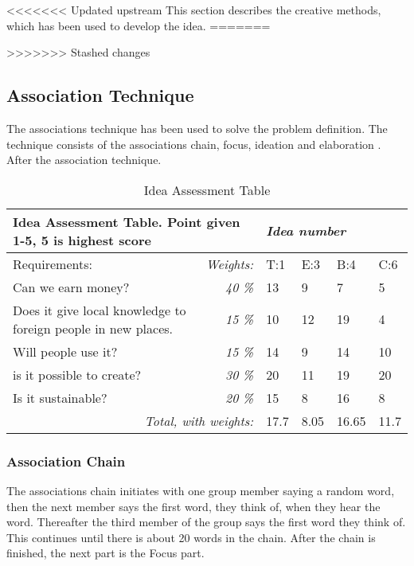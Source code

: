 <<<<<<< Updated upstream
This section describes the creative methods, which has been used to develop the idea.
=======


>>>>>>> Stashed changes
\subsection{Association Technique}
The associations technique has been used to solve the problem definition. The technique consists of the associations chain, focus, ideation and elaboration . After the association technique. 

\begin{table*}[t!]
\centering
\caption{Idea Assessment Table}
\label{tab:iass}
\begin{tabular}{|l|r|l|l|l|l|}
\hline
\multicolumn{2}{|l|}{\textbf{Idea Assessment Table. Point given 1-5, 5 is highest score}} & \multicolumn{4}{l|}{\textit{Idea number}} \\ \hline
Requirements: & \multicolumn{1}{l|}{\textit{Weights:}} & T:1 & E:3 & B:4 & C:6 \\ \hline
Can we earn money? & \textit{40 \%} & 13 & 9 & 7 & 5 \\ \hline
Does it give local knowledge to foreign people in new places. & \textit{15 \%} & 10 & 12 & 19 & 4 \\ \hline
Will people use it? & \textit{15 \%} & 14 & 9 & 14 & 10 \\ \hline
is it possible to create? & \textit{30 \%} & 20 & 11 & 19 & 20 \\ \hline
Is it sustainable? & \textit{20 \%} & 15 & 8 & 16 & 8 \\ \hline
\multicolumn{2}{|r|}{\textit{Total, with weights:}} & \cellcolor[HTML]{9AFF99}17.7 & \cellcolor[HTML]{FD6864}8.05 & \cellcolor[HTML]{FFFC9E}16.65 & \cellcolor[HTML]{FD6864}11.7 \\ \hline
\end{tabular}
\end{table*}

\subsubsection{Association Chain}
The associations chain initiates with one group member saying a random word, then the next member says the first word, they think of, when they hear the word. Thereafter the third member of the group says the first word they think of. This continues until there is about 20 words in the chain. After the chain is finished, the next part is the Focus part.

